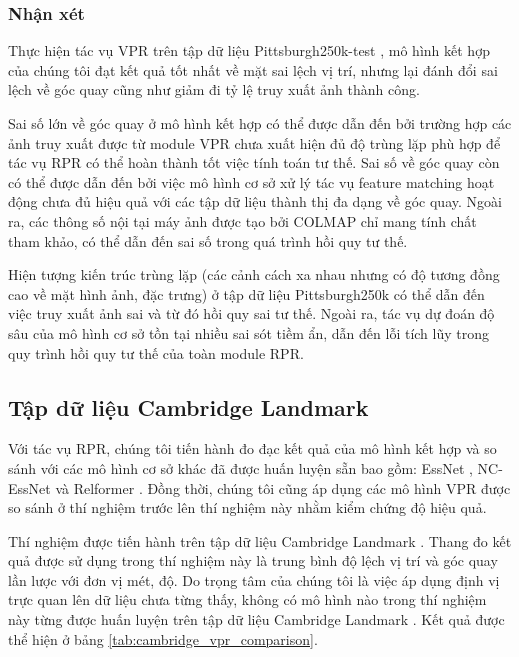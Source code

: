 \subsubsection*{Nhận xét}
Thực hiện tác vụ VPR trên tập dữ liệu Pittsburgh250k-test \cite{6618963}, mô hình kết hợp của chúng tôi đạt kết quả tốt nhất về mặt sai lệch vị trí, nhưng lại đánh đổi sai lệch về góc quay cũng như giảm đi tỷ lệ truy xuất ảnh thành công.

Sai số lớn về góc quay ở mô hình kết hợp có thể được dẫn đến bởi trường hợp các ảnh truy xuất được từ module VPR chưa xuất hiện đủ độ trùng lặp phù hợp để tác vụ RPR có thể hoàn thành tốt việc tính toán tư thế. Sai số về góc quay còn có thể được dẫn đến bởi việc mô hình cơ sở xử lý tác vụ feature matching hoạt động chưa đủ hiệu quả với các tập dữ liệu thành thị đa dạng về góc quay. Ngoài ra, các thông số nội tại máy ảnh được tạo bởi COLMAP\cite{schoenberger2016sfm} chỉ mang tính chất tham khảo, có thể dẫn đến sai số trong quá trình hồi quy tư thế.

Hiện tượng kiến trúc trùng lặp (các cảnh cách xa nhau nhưng có độ tương đồng cao về mặt hình ảnh, đặc trưng) ở tập dữ liệu Pittsburgh250k \cite{6618963} có thể dẫn đến việc truy xuất ảnh sai và từ đó hồi quy sai tư thế. Ngoài ra, tác vụ dự đoán độ sâu của mô hình cơ sở tồn tại nhiều sai sót tiềm ẩn, dẫn đến lỗi tích lũy trong quy trình hồi quy tư thế của toàn module RPR.

\subsection*{Tập dữ liệu Cambridge Landmark}

Với tác vụ RPR, chúng tôi tiến hành đo đạc kết quả của mô hình kết hợp và so sánh với các mô hình cơ sở khác đã được huấn luyện sẵn bao gồm: EssNet \cite{zhou2020learn}, NC-EssNet \cite{zhou2020learn} và Relformer \cite{idan2023learning}. Đồng thời, chúng tôi cũng áp dụng các mô hình VPR được so sánh ở thí nghiệm trước lên thí nghiệm này nhằm kiểm chứng độ hiệu quả.

Thí nghiệm được tiến hành trên tập dữ liệu Cambridge Landmark \cite{kendall2016posenet}. Thang đo kết quả được sử dụng trong thí nghiệm này là trung bình độ lệch vị trí và góc quay lần lược với đơn vị mét, độ. Do trọng tâm của chúng tôi là việc áp dụng định vị trực quan lên dữ liệu chưa từng thấy, không có mô hình nào trong thí nghiệm này từng được huấn luyện trên tập dữ liệu Cambridge Landmark \cite{kendall2016posenet}. Kết quả được thể hiện ở bảng \ref{tab:cambridge_vpr_comparison}.

